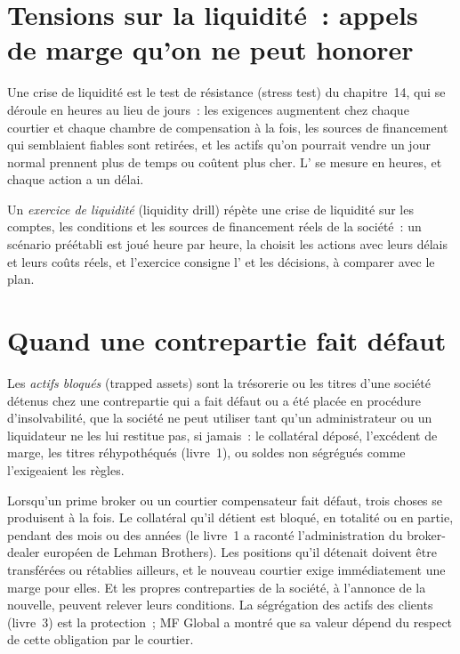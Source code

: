 \section{Tensions sur la liquidité~: appels de marge qu'on ne peut honorer}

Une crise de liquidité est le test de résistance (stress test) du chapitre~14, qui se déroule en heures au lieu de jours~: les exigences augmentent chez chaque courtier et chaque chambre de compensation à la fois,
les sources de financement qui semblaient fiables sont retirées, et les actifs qu'on pourrait vendre un jour normal prennent plus de temps ou coûtent plus cher. L'
se mesure en heures, et chaque action a un délai.

\begin{definition}\label{def:fm:crisis-management:drill}
Un \emph{exercice de liquidité} (liquidity drill) répète une crise de liquidité sur les comptes, les conditions et les sources de financement réels de la société~: un
scénario préétabli est joué heure par heure, la  choisit les actions avec leurs délais et leurs coûts réels, et l'exercice consigne l'
et les décisions, à comparer avec le plan.
\end{definition}

\section{Quand une contrepartie fait défaut}

\begin{definition}\label{def:fm:crisis-management:trapped}
Les \emph{actifs bloqués} (trapped assets) sont la trésorerie ou les titres d'une société détenus chez une contrepartie qui a fait défaut ou a été placée
en procédure d'insolvabilité, que la société ne peut utiliser tant qu'un administrateur ou un liquidateur ne les lui restitue pas, si jamais~: le collatéral déposé, l'excédent de marge, les titres
réhypothéqués (livre~1), ou soldes non ségrégués comme l'exigeaient les règles.
\end{definition}

Lorsqu'un prime broker ou un courtier compensateur fait défaut, trois choses se produisent à la fois. Le collatéral qu'il détient est bloqué, en totalité ou en partie, pendant des mois ou
des années (le livre~1 a raconté l'administration du broker-dealer européen de Lehman Brothers). Les positions qu'il détenait doivent être transférées ou rétablies
ailleurs, et le nouveau courtier exige immédiatement une marge pour elles. Et les propres contreparties de la société, à l'annonce de la nouvelle, peuvent relever leurs conditions.
La ségrégation des actifs des clients (livre~3) est la protection~; MF Global a montré que sa valeur dépend du respect de cette obligation par le courtier.

